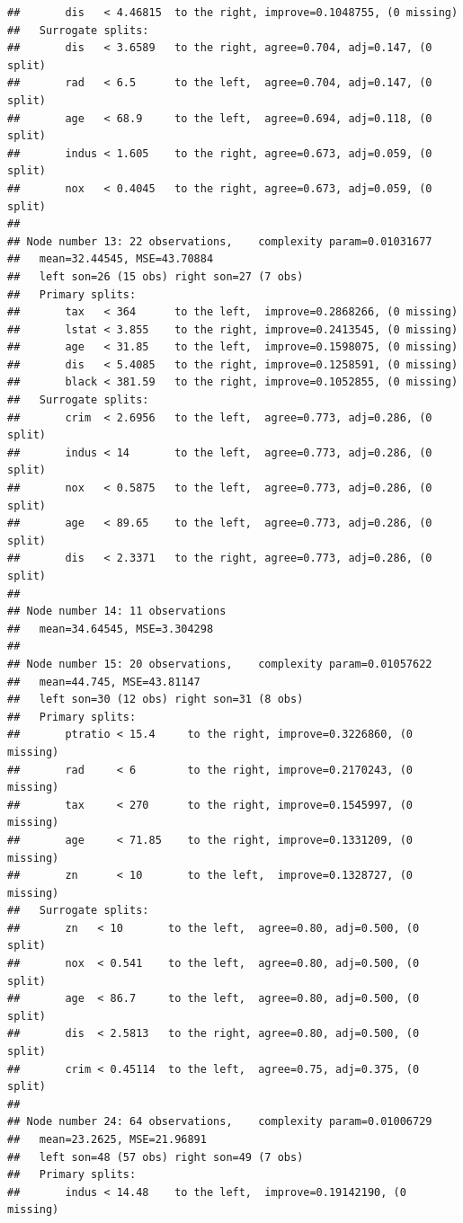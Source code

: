 \documentclass[]{book}
\theoremstyle{plain}
\theoremstyle{definition}
\begin{document}
\begin{verbatim}
##       dis   < 4.46815  to the right, improve=0.1048755, (0 missing)
##   Surrogate splits:
##       dis   < 3.6589   to the right, agree=0.704, adj=0.147, (0 split)
##       rad   < 6.5      to the left,  agree=0.704, adj=0.147, (0 split)
##       age   < 68.9     to the left,  agree=0.694, adj=0.118, (0 split)
##       indus < 1.605    to the right, agree=0.673, adj=0.059, (0 split)
##       nox   < 0.4045   to the right, agree=0.673, adj=0.059, (0 split)
## 
## Node number 13: 22 observations,    complexity param=0.01031677
##   mean=32.44545, MSE=43.70884 
##   left son=26 (15 obs) right son=27 (7 obs)
##   Primary splits:
##       tax   < 364      to the left,  improve=0.2868266, (0 missing)
##       lstat < 3.855    to the right, improve=0.2413545, (0 missing)
##       age   < 31.85    to the left,  improve=0.1598075, (0 missing)
##       dis   < 5.4085   to the right, improve=0.1258591, (0 missing)
##       black < 381.59   to the right, improve=0.1052855, (0 missing)
##   Surrogate splits:
##       crim  < 2.6956   to the left,  agree=0.773, adj=0.286, (0 split)
##       indus < 14       to the left,  agree=0.773, adj=0.286, (0 split)
##       nox   < 0.5875   to the left,  agree=0.773, adj=0.286, (0 split)
##       age   < 89.65    to the left,  agree=0.773, adj=0.286, (0 split)
##       dis   < 2.3371   to the right, agree=0.773, adj=0.286, (0 split)
## 
## Node number 14: 11 observations
##   mean=34.64545, MSE=3.304298 
## 
## Node number 15: 20 observations,    complexity param=0.01057622
##   mean=44.745, MSE=43.81147 
##   left son=30 (12 obs) right son=31 (8 obs)
##   Primary splits:
##       ptratio < 15.4     to the right, improve=0.3226860, (0 missing)
##       rad     < 6        to the right, improve=0.2170243, (0 missing)
##       tax     < 270      to the right, improve=0.1545997, (0 missing)
##       age     < 71.85    to the right, improve=0.1331209, (0 missing)
##       zn      < 10       to the left,  improve=0.1328727, (0 missing)
##   Surrogate splits:
##       zn   < 10       to the left,  agree=0.80, adj=0.500, (0 split)
##       nox  < 0.541    to the left,  agree=0.80, adj=0.500, (0 split)
##       age  < 86.7     to the left,  agree=0.80, adj=0.500, (0 split)
##       dis  < 2.5813   to the right, agree=0.80, adj=0.500, (0 split)
##       crim < 0.45114  to the left,  agree=0.75, adj=0.375, (0 split)
## 
## Node number 24: 64 observations,    complexity param=0.01006729
##   mean=23.2625, MSE=21.96891 
##   left son=48 (57 obs) right son=49 (7 obs)
##   Primary splits:
##       indus < 14.48    to the left,  improve=0.19142190, (0 missing)

\end{verbatim}
\end{document}
